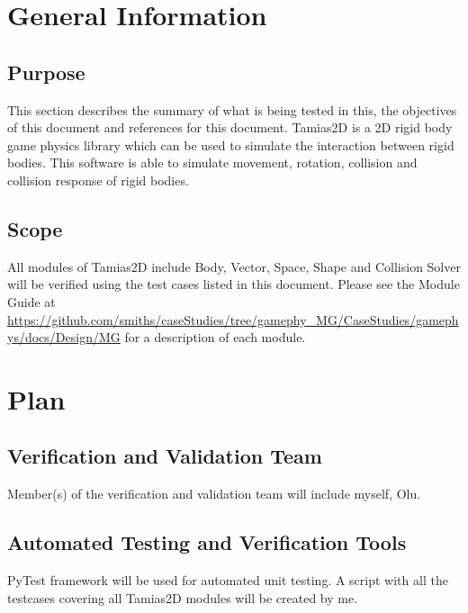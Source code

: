 \documentclass[12pt, titlepage]{article}
\newcommand{\progname}{Tamias2D}
\begin{document}

\section{General Information}
\subsection{Purpose}

This section describes the summary of what is being tested in this, the objectives of this document and references for this document. \progname{} is a 2D rigid body game physics library which can be used to simulate the interaction between rigid bodies. This software is able to simulate movement, rotation, collision and collision response of rigid bodies.

\subsection{Scope}

All modules of \progname{} include Body, Vector, Space, Shape and Collision Solver will be verified using the test cases listed in this document. Please see the Module Guide at \url{https://github.com/smiths/caseStudies/tree/gamephy_MG/CaseStudies/gamephys/docs/Design/MG} for a description of each module.

\section{Plan}
	
\subsection{Verification and Validation Team}

Member(s) of the verification and validation team will include myself, Olu.

\subsection{Automated Testing and Verification Tools}

PyTest framework will be used for automated unit testing. A script with all the testcases covering all \progname{} modules will be created by me.
\end{document}
